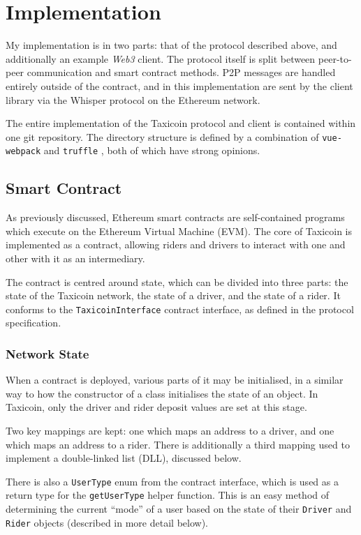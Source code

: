 \section{Implementation}

My implementation is in two parts: that of the protocol described above, and additionally an example \textit{Web3} client. The protocol itself is split between peer-to-peer communication and smart contract methods. P2P messages are handled entirely outside of the contract, and in this implementation are sent by the client library via the Whisper protocol on the Ethereum network.

The entire implementation of the Taxicoin protocol and client is contained within one git repository. The directory structure is defined by a combination of \lstinline{vue-webpack} \cite{VueWebpack} and \lstinline{truffle} \cite{Truffle}, both of which have strong opinions.

\subsection{Smart Contract}

As previously discussed, Ethereum smart contracts are self-contained programs which execute on the Ethereum Virtual Machine (EVM). The core of Taxicoin is implemented as a contract, allowing riders and drivers to interact with one and other with it as an intermediary.

The contract is centred around state, which can be divided into three parts: the state of the Taxicoin network, the state of a driver, and the state of a rider. It conforms to the \lstinline{TaxicoinInterface} contract interface, as defined in the protocol specification.

\subsubsection{Network State}

When a contract is deployed, various parts of it may be initialised, in a similar way to how the constructor of a class initialises the state of an object. In Taxicoin, only the driver and rider deposit values are set at this stage.

Two key mappings are kept: one which maps an address to a driver, and one which maps an address to a rider. There is additionally a third mapping used to implement a double-linked list (DLL), discussed below.

There is also a \lstinline{UserType} enum from the contract interface, which is used as a return type for the \lstinline{getUserType} helper function. This is an easy method of determining the current \enquote{mode} of a user based on the state of their \lstinline{Driver} and \lstinline{Rider} objects (described in more detail below).

